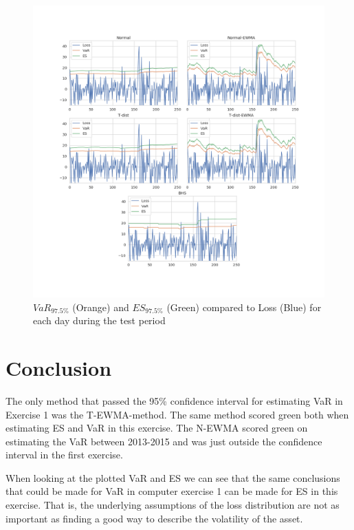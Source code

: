 \documentclass[a4paper]{article}
\begin{document}
\begin{figure}[h]
    \includegraphics[width=\textwidth]{plot.png}
    \caption{$VaR_{97.5\%}$ (Orange) and $ES_{97.5\%}$ (Green) compared to Loss (Blue) for each day during the test period}
    \label{var2}
\end{figure}

\section{Conclusion}
The only method that passed the 95\% confidence interval for estimating VaR in Exercise 1 was the T-EWMA-method. The same method scored green both when estimating ES and VaR in this exercise. The N-EWMA scored green on estimating the VaR between 2013-2015 and was just outside the confidence interval in the first exercise. 

When looking at the plotted VaR and ES we can see that the same conclusions that could be made for VaR in computer exercise 1 can be made for ES in this exercise. That is, the underlying assumptions of the loss distribution are not as important as finding a good way to describe the volatility of the asset. 
\end{document}
